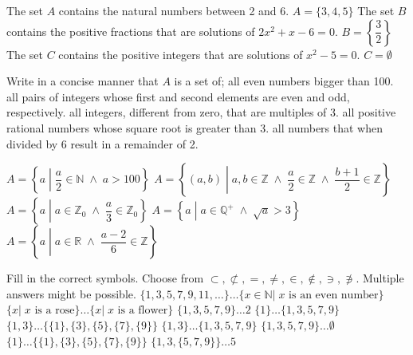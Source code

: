 \begin{Answer} \phantom{}
	
    	\Question The set $A$ contains the natural numbers  between 2 and 6. $A = \{3,4,5\}$
    	\Question The set $B$ contains the positive fractions that are solutions of $2x^2 +x-6=0 $. $B = \left\{ \dfrac{3}{2} \right\}$
    	\Question The set $C$ contains the positive integers that are solutions of $x^2-5=0$. $C = \emptyset$
\end{Answer}


\begin{Exercise} Write in a concise manner that $A$ is a set of; 
	\Question[difficulty = 1] all even numbers bigger than 100.
	\Question[difficulty = 1] all pairs of integers whose first and second elements are even and odd, respectively.
	\Question[difficulty = 1] all integers, different from zero, that are multiples of 3.
	\Question[difficulty = 1] all positive rational numbers whose square root is greater than 3.
	\Question[difficulty = 2] all numbers that when divided by 6 result in a remainder of 2.
\end{Exercise}

\begin{Answer}\phantom{}
    \begin{multicols}{2}

    		\Question $A = \left\{a\; \left|\; \dfrac{a}{2}\in \mathbb{N} \; \wedge \; a > 100 \right. \right\}$
    		\Question $A = \left\{(a,b)\; \left|\; a,b \in \mathbb{Z} \; \wedge \; \dfrac{a}{2} \in \mathbb{Z} \; \wedge \; \dfrac{b+1}{2} \in \mathbb{Z} \right. \right\}$
            \Question $A = \left\{a\; \left|\; a\in \mathbb{Z}_0 \; \wedge \; \dfrac{a}{3}\in \mathbb{Z}_0 \right. \right\}$  %
            \Question $A = \left\{a\; \left|\; a\in \mathbb{Q}^+ \; \wedge \; \sqrt{a}>3 \right. \right\}$ 
            \Question $A = \left\{a\; \left|\; a\in \mathbb{R} \; \wedge \; \dfrac{a-2}{6} \in \mathbb{Z} \right. \right\}$
    	\EndCurrentQuestion
    \end{multicols}
\end{Answer}
	
\begin{Exercise} Fill in the correct symbols. Choose from $\subset, \not\subset, =, \neq, \in,  \not\in, \ni, \not\ni$. Multiple answers might be possible.
	\Question[difficulty = 1] $\{1, 3, 5, 7, 9, 11, \ldots \} \ldots \{ x \in \mathbb{N} | \; x \text{ is an even number} \}$
	\Question[difficulty = 1] $\{ x | \; x \text{ is a rose} \} \ldots \{ x | \; x \text{ is a flower} \}$
	\Question[difficulty = 1] $\{1, 3, 5, 7, 9 \} \ldots 2$
	\Question[difficulty = 1] $\{1\} \ldots \{1, 3, 5, 7, 9 \} $
	\Question[difficulty = 1] $\{1,3\} \ldots \{\{1\}, \{3\}, \{5\}, \{7\}, \{9\} \} $
	\Question[difficulty = 1] $\{1,3\} \ldots \{1, 3, 5, 7, 9 \} $
	\Question[difficulty = 1] $\{1, 3, 5, 7, 9 \} \ldots \emptyset$
	\ifanalysis\Question[difficulty = 1]\fi \ifcalculus\Question[difficulty = 2]\fi $\{1\} \ldots \{\{1\}, \{3\}, \{5\}, \{7\}, \{9\} \} $
	\Question[difficulty = 2] $\{1, 3, \{5, 7, 9\} \} \ldots 5$
\end{Exercise}


